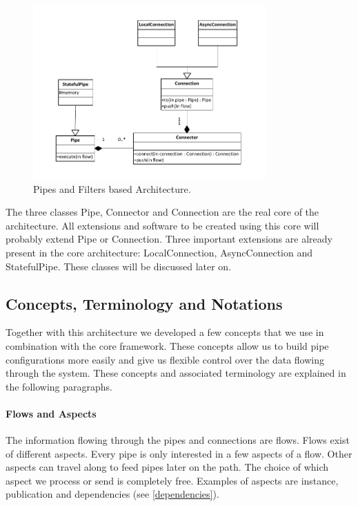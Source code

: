 \begin{figure}[htp]
	\centering
		\includegraphics[width=0.8\textwidth]{fig/architecturev2}
	\caption{Pipes and Filters based Architecture.}
	\label{fig:architecturev2}
\end{figure}

The three classes Pipe, Connector and Connection are the real core of the architecture. All extensions and software to be created using this core will probably extend Pipe or Connection. Three important extensions are already present in the core architecture: LocalConnection, AsyncConnection and StatefulPipe. These classes will be discussed later on.

\subsection{Concepts, Terminology and Notations}

Together with this architecture we developed a few concepts that we use in combination with the core framework. These concepts allow us to build pipe configurations more easily and give us flexible control over the data flowing through the system. These concepts and associated terminology are explained in the following paragraphs.

\paragraph{Flows and Aspects} The information flowing through the pipes and connections are flows. Flows exist of different aspects. Every pipe is only interested in a few aspects of a flow. Other aspects can travel along to feed pipes later on the path. The choice of which aspect we process or send is completely free. Examples of aspects are instance, publication and dependencies (see \autoref{dependencies}).

